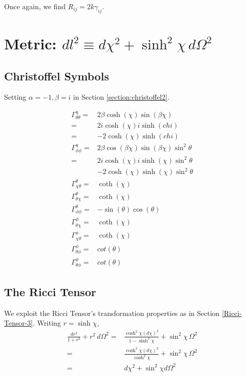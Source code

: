 \documentclass[]{article}
\begin{document}
Once again, we find $R_{ij}=2 k \gamma_{ij}$.

\section{Metric: $dl^2\equiv d\chi^2+\sinh^2 \chi\,d\Omega^2$} \label{section:metric4}

\subsection{Christoffel Symbols}

Setting $\alpha=-1,\beta=i$ in Section \ref{section:christoffel2}.

\begin{align*}
\Gamma^{\chi}_{\theta\theta}=&2\beta \cosh{(\chi)}\sin{(\beta\chi)}\\
=&2i \cosh{(\chi)}i \sinh{(chi)}\\
=&-2 \cosh{(\chi)} \sinh{(chi)}\\
\Gamma^{\chi}_{\phi\phi}=&2\beta \cos{(\beta\chi)}\sin{(\beta\chi)}\sin^2 \theta\\
=&2i \cosh{(\chi)} i \sinh{(\chi)}\sin^2 \theta\\
&-2 \cosh{(\chi)}  \sinh{(\chi)}\sin^2 \theta\\
\Gamma^{\theta}_{\chi\theta}=&\coth{(\chi)}\\
\Gamma^{\theta}_{\theta\chi}=&\coth{(\chi)}\\
\Gamma^{\theta}_{\phi\phi}=&-\sin{(\theta)}\cos{(\theta)}\\
\Gamma^{\phi}_{\theta\chi}=&\coth{(\chi)}\\
\Gamma^{\phi}_{\chi\theta}=&\coth{(\chi)}\\
\Gamma^{\phi}_{\theta\phi}=&cot{(\theta)}\\
\Gamma^{\phi}_{\theta\phi}=&cot{(\theta)}
\end{align*}

\subsection{The Ricci Tensor}

We exploit the Ricci Tensor's transformation properties as in Section \ref{Ricci-Tensor-3}. Writing $r=\sinh \chi$,
\begin{align*}
\frac{dr^2}{1+r^2}+r^2\,d\Omega^2=&\frac{\cosh^2 \chi (d \chi)^2}{1-\sinh^2 \chi}+\sin^2 \chi\,\Omega^2\\
=&\frac{\cosh^2 \chi (d \chi)^2}{\cosh^2 \chi}+\sin^2 \chi\,\Omega^2\\
=&d\chi^2 + \sin^2 \chi d\Omega^2
\end{align*}
\end{document}
